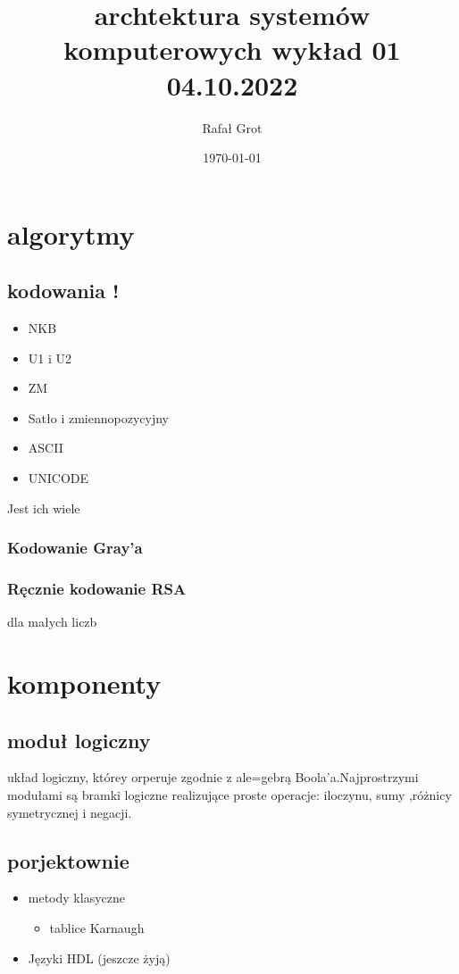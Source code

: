 \documentclass[11pt]{article}
\author{Rafał Grot}
\date{\today}
\title{archtektura systemów komputerowych wykład 01 04.10.2022}
\begin{document}
\maketitle
\tableofcontents

\section{algorytmy}
\label{sec:org6b16de6}
\subsection{kodowania !}
\label{sec:orgdc62c89}
\begin{itemize}
\item NKB
\item U1 i U2
\item ZM
\item Satło i zmiennopozycyjny
\item ASCII
\item UNICODE
\end{itemize}
Jest ich wiele
\subsubsection{Kodowanie Gray'a}
\label{sec:org8905cb4}
\subsubsection{Ręcznie kodowanie RSA}
\label{sec:org06ef12b}
dla małych liczb
\section{komponenty}
\label{sec:orgaef5814}
\subsection{moduł logiczny}
\label{sec:orgf2873ed}
układ logiczny, którey orperuje zgodnie z ale=gebrą Boola'a.Najprostrzymi modułami są bramki logiczne realizujące proste operacje: iloczynu, sumy ,różnicy symetrycznej i negacji.
\subsection{porjektownie}
\label{sec:org88cbb00}
\begin{itemize}
\item metody klasyczne
\begin{itemize}
\item tablice Karnaugh
\end{itemize}
\item Języki HDL
(jeszcze żyją)
\end{itemize}
\end{document}
